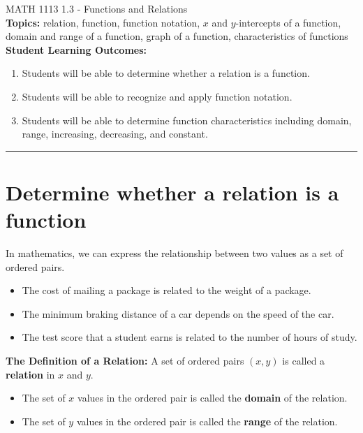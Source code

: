 \documentclass[11pt]{article}
\begin{document}
\noindent MATH 1113   \hfill 1.3 - Functions and Relations\\



\noindent \textbf{Topics:}  relation, function, function notation, $x$ and $y$-intercepts of a function, domain and range of a function, graph of a function, characteristics of functions\\

\noindent \textbf{Student Learning Outcomes:}
\begin{enumerate}
\item Students will be able to determine whether a relation is a function.
\item Students will be able to recognize and apply function notation.
\item Students will be able to determine function characteristics including domain, range, increasing, decreasing, and constant.
\end{enumerate}

\hrule 
\vspace{5mm}
\section{Determine whether a relation is a function}
In mathematics, we can express the relationship between two values as a set of ordered pairs.
\begin{itemize}
\item The cost of mailing a package is related to the weight of a package.
\item The minimum braking distance of a car depends on the speed of the car.
\item The test score that a student earns is related to the number of hours of study.\\
\end{itemize}

\noindent \textbf{The Definition of a Relation:}  A set of ordered pairs $(x,y)$ is called a \textbf{relation} in $x$ and $y$.
\begin{itemize}
\item The set of $x$ values in the ordered pair is called the \textbf{domain} of the relation.
\item The set of $y$ values in the ordered pair is called the \textbf{range} of the relation.\\
\end{itemize}
\end{document}
